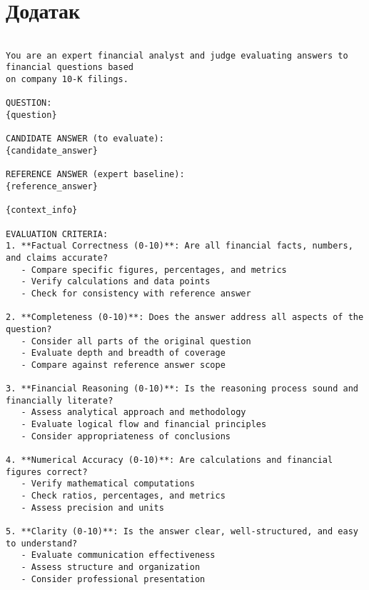 \cleardoublepage
\chapter*{Додатак}
\label{appendix:llm_judge_prompt}

\begin{center}
    \begin{listing}[!ht]
    \footnotesize
    \begin{verbatim}

You are an expert financial analyst and judge evaluating answers to financial questions based 
on company 10-K filings.

QUESTION:
{question}

CANDIDATE ANSWER (to evaluate):
{candidate_answer}

REFERENCE ANSWER (expert baseline):
{reference_answer}

{context_info}

EVALUATION CRITERIA:
1. **Factual Correctness (0-10)**: Are all financial facts, numbers, and claims accurate?
   - Compare specific figures, percentages, and metrics
   - Verify calculations and data points
   - Check for consistency with reference answer

2. **Completeness (0-10)**: Does the answer address all aspects of the question?
   - Consider all parts of the original question
   - Evaluate depth and breadth of coverage
   - Compare against reference answer scope

3. **Financial Reasoning (0-10)**: Is the reasoning process sound and financially literate?
   - Assess analytical approach and methodology
   - Evaluate logical flow and financial principles
   - Consider appropriateness of conclusions

4. **Numerical Accuracy (0-10)**: Are calculations and financial figures correct?
   - Verify mathematical computations
   - Check ratios, percentages, and metrics
   - Assess precision and units

5. **Clarity (0-10)**: Is the answer clear, well-structured, and easy to understand?
   - Evaluate communication effectiveness
   - Assess structure and organization
   - Consider professional presentation

    \end{verbatim}
    \end{listing}
    \end{center}


